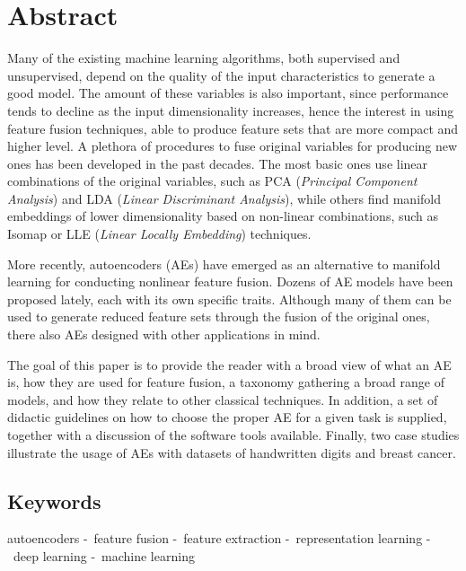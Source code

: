 
\providecommand{\sep}{-~}


\section*{Abstract}
Many of the existing machine learning algorithms, both supervised and unsupervised, depend on the quality of the input characteristics to generate a good model. The amount of these variables is also important, since performance tends to decline as the input dimensionality increases, hence the interest in using feature fusion techniques, able to produce feature sets that are more compact and higher level. A plethora of procedures to fuse original variables for producing new ones has been developed in the past decades. The most basic ones use linear combinations of the original variables, such as PCA (\textit{Principal Component Analysis}) and LDA (\textit{Linear Discriminant Analysis}), while others find manifold embeddings of lower dimensionality based on non-linear combinations, such as Isomap or LLE (\textit{Linear Locally Embedding}) techniques. 

More recently, autoencoders (AEs) have emerged as an alternative to manifold learning for conducting nonlinear feature fusion. Dozens of AE models have been proposed lately, each with its own specific traits. Although many of them can be used to generate reduced feature sets through the fusion of the original ones, there also AEs designed with other applications in mind.

The goal of this paper is to provide the reader with a broad view of what an AE is, how they are used for feature fusion, a taxonomy gathering a broad range of models, and how they relate to other classical techniques. In addition, a set of didactic guidelines on how to choose the proper AE for a given task is supplied, together with a discussion of the software tools available. Finally, two case studies illustrate the usage of AEs with datasets of handwritten digits and breast cancer.

\subsection*{Keywords}
autoencoders \sep feature fusion \sep feature extraction \sep representation learning \sep deep learning \sep machine learning

